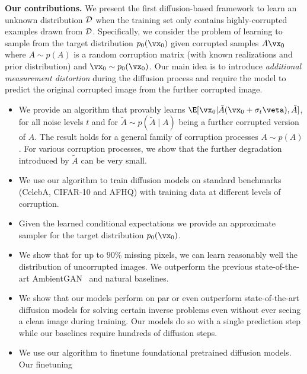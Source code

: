 \documentclass{article}
\begin{document}
\textbf{Our contributions.} We present the first diffusion-based framework to learn an unknown distribution ${\cal D}$ when the training set only contains highly-corrupted examples drawn from ${\cal D}$. Specifically, we consider the problem of learning to sample from the target distribution $p_0(\vx_0)$ given corrupted samples $A\vx_0$ where $A \sim p(A)$ is a random corruption matrix (with known realizations and prior distribution) and $\vx_0 \sim p_0(\vx_0)$.
Our main idea is to introduce {\em additional measurement distortion} during the diffusion process and require the model to predict the original corrupted image from the further corrupted image. \noindent
\begin{itemize}
        \item We provide an algorithm that provably learns $\E[\vx_0 | \tilde{A}(\vx_0 + \sigma_t \veta), \tilde{A}]$, for all noise levels $t$ and for $\tilde{A} \sim p(\tilde{A}\mid A)$ being a further corrupted version of $A$. The result holds for a general family of corruption processes $A \sim p(A)$. For various corruption processes, we show that the further degradation introduced by $\tilde{A}$ can be very small.
        \item We use our algorithm to train diffusion models on standard benchmarks (CelebA, CIFAR-10 and AFHQ) with training data at different levels of corruption.
        \item Given the learned conditional expectations we provide an approximate sampler for the target distribution $p_0(\vx_0)$.
        \item We show that for up to $90\%$ missing pixels, we can learn reasonably well the distribution of uncorrupted images.
        We outperform the previous state-of-the-art AmbientGAN~\citep{bora2018ambientgan} and natural baselines. 
        \item We show that our models perform on par or even outperform  state-of-the-art diffusion models for solving certain inverse problems even without ever seeing a clean image during training. Our models do so with a single prediction step while our baselines require hundreds of diffusion steps.
        \item We use our algorithm to finetune foundational pretrained diffusion models. Our finetuning 

\end{itemize}
\end{document}
